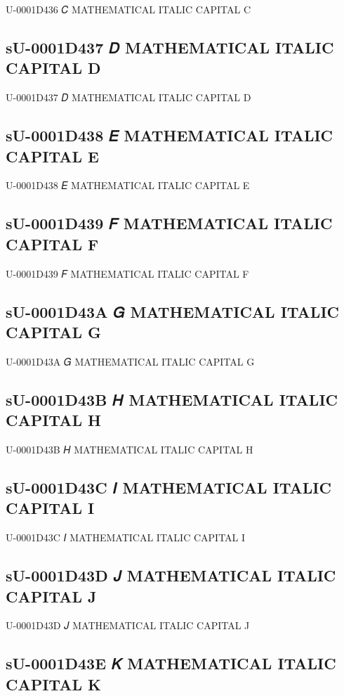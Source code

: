 U-0001D436 𝐶 MATHEMATICAL ITALIC CAPITAL C

\subsection{sU-0001D437 𝐷 MATHEMATICAL ITALIC CAPITAL D}

U-0001D437 𝐷 MATHEMATICAL ITALIC CAPITAL D

\subsection{sU-0001D438 𝐸 MATHEMATICAL ITALIC CAPITAL E}

U-0001D438 𝐸 MATHEMATICAL ITALIC CAPITAL E

\subsection{sU-0001D439 𝐹 MATHEMATICAL ITALIC CAPITAL F}

U-0001D439 𝐹 MATHEMATICAL ITALIC CAPITAL F

\subsection{sU-0001D43A 𝐺 MATHEMATICAL ITALIC CAPITAL G}

U-0001D43A 𝐺 MATHEMATICAL ITALIC CAPITAL G

\subsection{sU-0001D43B 𝐻 MATHEMATICAL ITALIC CAPITAL H}

U-0001D43B 𝐻 MATHEMATICAL ITALIC CAPITAL H

\subsection{sU-0001D43C 𝐼 MATHEMATICAL ITALIC CAPITAL I}

U-0001D43C 𝐼 MATHEMATICAL ITALIC CAPITAL I

\subsection{sU-0001D43D 𝐽 MATHEMATICAL ITALIC CAPITAL J}

U-0001D43D 𝐽 MATHEMATICAL ITALIC CAPITAL J

\subsection{sU-0001D43E 𝐾 MATHEMATICAL ITALIC CAPITAL K}

